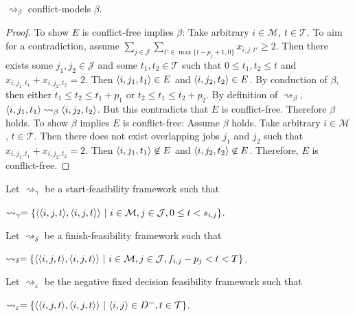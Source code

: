 \begin{lemma}
	\label{conflictfreenessbeta}
	$\rightsquigarrow_\beta$ conflict-models $\beta$.
	
	\begin{proof}
		To show $E$ is conflict-free implies $\beta$: Take arbitrary $i\in\mathcal{M}$, $t\in\mathcal{T}$. To aim for a contradiction, assume $\sum_{j\in\mathcal{J}}\sum_{t'\in\max\{t-p_j+1,0\}}x_{i,j,t'}\geq 2$. Then there exists some $j_1,j_2\in\mathcal{J}$ and some $t_1,t_2\in\mathcal{T}$ such that $0\leq t_1,t_2\leq t$ and $x_{i,j_1,t_1}+x_{i,j_2,t_2}=2$. Then $\langle{i},{j_1},{t_1}\rangle\in E$ and $\langle{i},{j_2},{t_2}\rangle\in E$. By conduction of $\beta$, then either $t_1\leq t_2\leq t_1+p_1$ or $t_2\leq t_1\leq t_2+p_2$. By definition of $\rightsquigarrow_\beta$, $\langle{i},{j_1},{t_1}\rangle\rightsquigarrow_\beta\langle{i},{j_2},{t_2}\rangle$. But this contradicts that $E$ is conflict-free. Therefore $\beta$ holds.
		\linespace
		To show $\beta$ implies $E$ is conflict-free: Assume $\beta$ holds. Take arbitrary $i\in\mathcal{M}$, $t\in\mathcal{T}$. Then there does not exist overlapping jobs $j_1$ and $j_2$ such that $x_{i,j_1,t_1}+x_{i,j_2,t_2}=2$. Then $\langle{i},{j_1},{t_1}\rangle\not\in E$ and $\langle{i},{j_2},{t_2}\rangle\not\in E$. Therefore, $E$ is conflict-free.
	\end{proof}
\end{lemma}

\begin{definition}
	\label{intervalgamma}
	
	Let $\rightsquigarrow_\gamma$ be a start-feasibility framework such that
	
	$\rightsquigarrow_\gamma=\{\pair{\triple{i}{j}{t}}{\triple{i}{j}{t}}\ |\ i\in\mathcal{M},j\in\mathcal{J},0\leq t<s_{i,j}\}$.
\end{definition}

\begin{definition}
	\label{intervaldelta}
	Let $\rightsquigarrow_\delta$ be a finish-feasibility framework such that
	
	$\rightsquigarrow_\delta=\{\pair{\triple{i}{j}{t}}{\triple{i}{j}{t}}\ |\ i\in\mathcal{M},j\in\mathcal{J},f_{i,j}-p_j<t<T\}$.
\end{definition}

\begin{definition}
	\label{intervalepsilon}
	
	Let $\rightsquigarrow_\varepsilon$ be the negative fixed decision feasibility framework such that
	
	$\rightsquigarrow_\varepsilon=\{\pair{\triple{i}{j}{t}}{\triple{i}{j}{t}}\ |\ \pair{i}{j}\in D^-,t\in\mathcal{T}\}$.
\end{definition}

